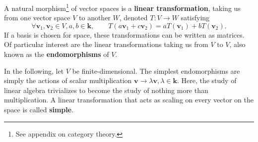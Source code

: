 		A natural morphism\footnote{See appendix on category theory.} of vector spaces is a \textbf{linear transformation}, taking us from one vector space $V$ to another $W$, denoted $T: V \to W$ satisfying
		$$\forall \mathbf v_1, \mathbf v_2 \in V, a, b \in \mathbf k, \qquad  T(a \mathbf v_1 + c \mathbf v_2) = a T(\mathbf v_1) + b T(\mathbf v_2).$$
		If a basis is chosen for space, these transformations can be written as matrices. Of particular interest are the linear transformations taking us from $V$ to $V$, also known as the \textbf{endomorphisms} of $V$. 
		
		In the following, let $V$ be finite-dimensional.
		The simplest endomorphisms are simply the actions of scalar multiplication $\mathbf v \to \lambda \mathbf v, \lambda \in \mathbf k$. Here, the study of linear algebra trivializes to become the study of nothing more than multiplication. A linear transformation that acts as scaling on every vector on the space is called \textbf{simple}.
		
